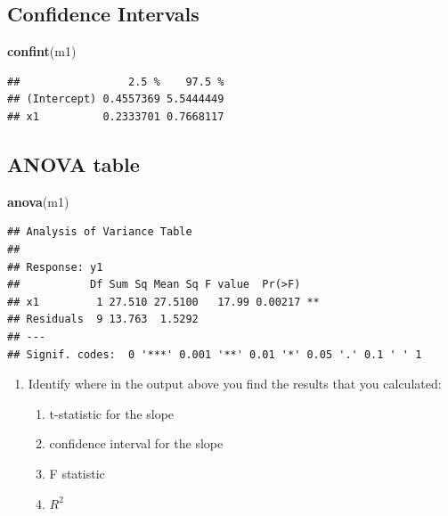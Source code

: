 \documentclass[]{article}
\newenvironment{Shaded}{\begin{snugshade}}{\end{snugshade}}
\newcommand{\KeywordTok}[1]{\textcolor[rgb]{0.13,0.29,0.53}{\textbf{#1}}}
\newcommand{\NormalTok}[1]{#1}
\providecommand{\tightlist}{%
  \setlength{\itemsep}{0pt}\setlength{\parskip}{0pt}}
\begin{document}
\hypertarget{confidence-intervals}{%
\subsection{Confidence Intervals}\label{confidence-intervals}}

\begin{Shaded}
\begin{Highlighting}[]
\KeywordTok{confint}\NormalTok{(m1)}
\end{Highlighting}
\end{Shaded}

\begin{verbatim}
##                 2.5 %    97.5 %
## (Intercept) 0.4557369 5.5444449
## x1          0.2333701 0.7668117
\end{verbatim}

\hypertarget{anova-table-1}{%
\subsection{ANOVA table}\label{anova-table-1}}

\begin{Shaded}
\begin{Highlighting}[]
\KeywordTok{anova}\NormalTok{(m1)}
\end{Highlighting}
\end{Shaded}

\begin{verbatim}
## Analysis of Variance Table
## 
## Response: y1
##           Df Sum Sq Mean Sq F value  Pr(>F)   
## x1         1 27.510 27.5100   17.99 0.00217 **
## Residuals  9 13.763  1.5292                   
## ---
## Signif. codes:  0 '***' 0.001 '**' 0.01 '*' 0.05 '.' 0.1 ' ' 1
\end{verbatim}

\begin{enumerate}
\def\labelenumi{\arabic{enumi}.}
\tightlist
\item
  Identify where in the output above you find the results that you
  calculated:

  \begin{enumerate}
  \def\labelenumii{\arabic{enumii}.}
  \tightlist
  \item
    t-statistic for the slope
  \item
    confidence interval for the slope
  \item
    F statistic
  \item
    \(R^2\)
  \end{enumerate}
\end{enumerate}
\end{document}
